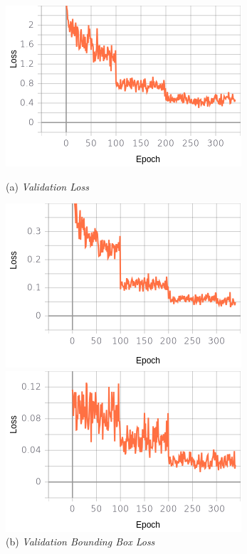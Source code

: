 \begin{figure}[H]
	\centering
	\begin{minipage}{0.45\textwidth}
		\includegraphics[width=\textwidth]{gambar/training_resnet50/tugas-akhir-Page-16.png}
		\caption*{(a) \textit{Validation Loss}}
	\end{minipage}
	\hfill
	\begin{minipage}{0.45\textwidth}
		\includegraphics[width=\textwidth]{gambar/training_resnet50/tugas-akhir-Page-16 (1).png}
		\caption*{(b) \textit{Validation Bounding Box Loss}}
	\end{minipage}
	\vfill
	\begin{minipage}{0.45\textwidth}
		\includegraphics[width=\textwidth]{gambar/training_resnet50/tugas-akhir-Page-16 (2).png}

\end{minipage}
\end{figure}
